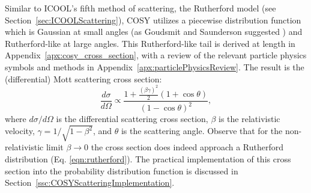 %
%
 \label{sec:COSYScattering}\par
Similar to ICOOL's fifth method of scattering, the Rutherford model (see Section~\ref{sec:ICOOLScattering}), COSY utilizes a piecewise distribution function which is Gaussian  at small angles (as Goudsmit and Saunderson suggested \cite{gs}) and Rutherford-like at large angles. This Rutherford-like tail is derived at length in Appendix~\ref{apx:cosy_cross_section}, with a review of the relevant particle physics symbols and methods in Appendix~\ref{apx:particlePhysicsReview}. The result is the (differential) Mott scattering cross section:
\begin{equation}\label{eqn:MottCrossSection}
\frac{d\sigma}{d\Omega} \propto \frac{1+\frac{(\beta\gamma)^2}{2} (1+\cos\theta)  }{(1-\cos\theta)^2},
\end{equation}
where $d\sigma/d\Omega$ is the differential scattering cross section, $\beta$ is the relativistic velocity, $\gamma=1/\sqrt{1-\beta^2}$, and $\theta$ is the scattering angle. Observe that for the non-relativistic limit $\beta\rightarrow 0$ the cross section does indeed approach a Rutherford distribution (Eq. \eqref{eqn:rutherford}). The practical implementation of this cross section into the probability distribution function is discussed in Section~\ref{ssc:COSYScatteringImplementation}.

